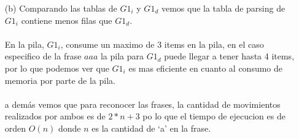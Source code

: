 \documentclass{article}
\begin{document}
\begin{enumerate}
\begin{enumerate}
\begin{enumerate}
						\end{enumerate}
					\item[(b)] Comparando las tablas de $G1_{i}$ y $G1_{d}$ vemos que la tabla de parsing de $G1_{i}$ contiene menos filas que $G1_{d}$. 
					\\\\
					En la pila, $G1_{i}$, consume un maximo de 3 items en la pila, en el caso especifico de la frase $aaa$ la pila  para $G1_{d}$ puede llegar a tener hasta 4 items, por lo que podemos ver que $G1_{i}$ es mas eficiente en cuanto al consumo de memoria por parte de la pila.
					\\\\
					a dem\'as vemos que para reconocer las frases, la cantidad de movimientos realizados por ambos es de $2*n+3$ po lo que el tiempo de ejecucion es de orden $O(n)$ donde $n$ es la cantidad de `a' en la frase.
					\\\\ 


\end{enumerate}
\end{enumerate}
\end{document}
